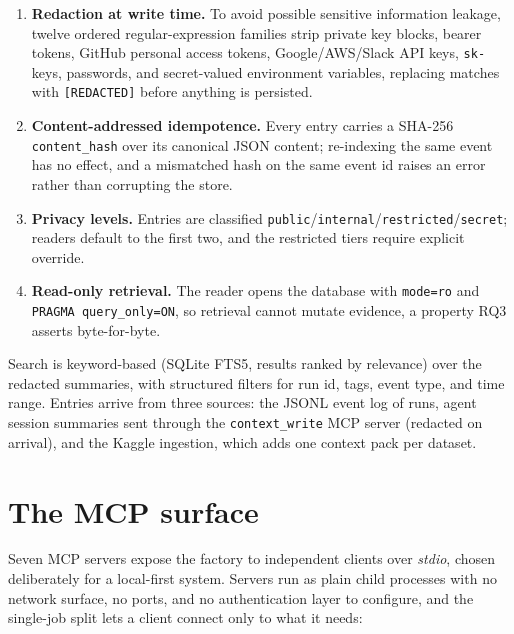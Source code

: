 \begin{enumerate}
	\item \textbf{Redaction at write time.} To avoid possible sensitive information leakage, twelve ordered regular-expression families strip private key blocks, bearer tokens, GitHub personal access tokens, Google/AWS/Slack API keys, \texttt{sk-} keys, passwords, and secret-valued environment variables, replacing matches with \texttt{[REDACTED]} before anything is persisted.
	\item \textbf{Content-addressed idempotence.} Every entry carries a SHA-256 \texttt{content\_hash} over its canonical JSON content; re-indexing the same event has no effect, and a mismatched hash on the same event id raises an error rather than corrupting the store.
	\item \textbf{Privacy levels.} Entries are classified \texttt{public}/\texttt{internal}/\texttt{restricted}/\texttt{secret}; readers default to the first two, and the restricted tiers require explicit override.
	\item \textbf{Read-only retrieval.} The reader opens the database with \texttt{mode=ro} and \texttt{PRAGMA query\_only=ON}, so retrieval cannot mutate evidence, a property RQ3 asserts byte-for-byte.
\end{enumerate}

Search is keyword-based (SQLite FTS5, results ranked by relevance) over the redacted summaries, with structured filters for run id, tags, event type, and time range. Entries arrive from three sources: the JSONL event log of runs, agent session summaries sent through the \texttt{context\_write} MCP server (redacted on arrival), and the Kaggle ingestion, which adds one context pack
per dataset.


\section{The MCP surface}
\label{sec:mcp}

Seven MCP servers expose the factory to independent clients over \emph{stdio}, chosen deliberately for a local-first system. Servers run as plain child processes with no network surface, no ports, and no authentication layer to configure, and the single-job split lets a client connect only to what it needs:

